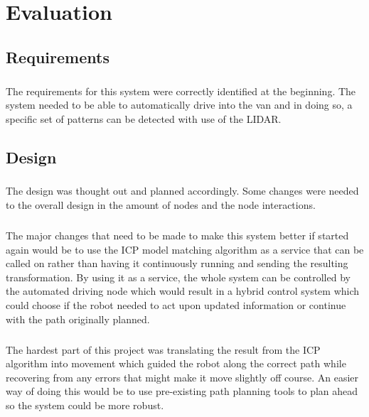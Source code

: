 \chapter{Evaluation}

\section{Requirements}
\paragraph{}
The requirements for this system were correctly identified at the beginning. The system needed to be able to automatically drive into the van and in doing so, a specific set of patterns can be detected with use of the LIDAR.

\section{Design}
\paragraph{}
The design was thought out and planned accordingly. Some changes were needed to the overall design in the amount of nodes and the node interactions.

\paragraph{}
The major changes that need to be made to make this system better if started again would be to use the ICP model matching algorithm as a service that can be called on rather than having it continuously running and sending the resulting transformation. By using it as a service, the whole system can be controlled by the automated driving node which would result in a hybrid control system which could choose if the robot needed to act upon updated information or continue with the path originally planned.

\paragraph{}
The hardest part of this project was translating the result from the ICP algorithm into movement which guided the robot along the correct path while recovering from any errors that might make it move slightly off course. An easier way of doing this would be to use pre-existing path planning tools to plan ahead so the system could be more robust.

